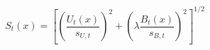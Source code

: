 \documentclass{article}
\begin{document}
\begin{equation*}
S_t(x)=\left[\left(\frac{U_t(x)}{s_{U,t}}\right)^2+\left(\lambda\frac{B_t(x)}{s_{B,t}}\right)^2\right]^{1/2}
\end{equation*}
\end{document}

